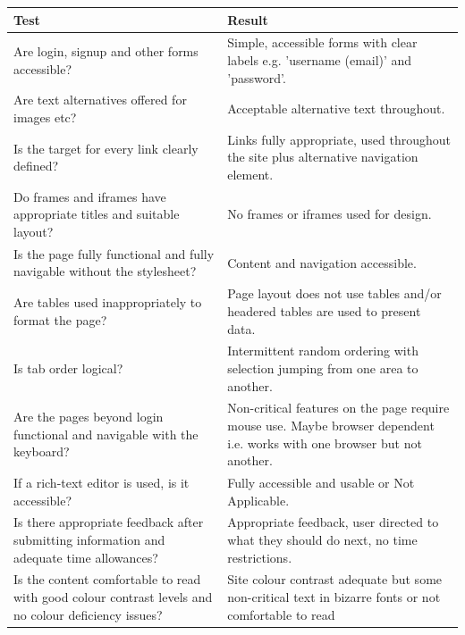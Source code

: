 \begin{table}
  \centering
  \begin{tabular}{|p{150px}|p{250px}|}
    \hline
    Test  & Result\\ \hline

    Are login, signup and other forms accessible? & Simple, accessible forms with clear labels e.g. 'username (email)' and 'password'. \\ \hline

    Are text alternatives offered for images etc? & Acceptable alternative text throughout. \\ \hline

    Is the target for every link clearly defined? & Links fully appropriate, used throughout the site plus alternative navigation element. \\ \hline

    Do frames and iframes have appropriate titles and suitable layout? & No frames or iframes used for design. \\ \hline

    Is the page fully functional and fully navigable without the stylesheet? & Content and navigation accessible. \\ \hline

    Are tables used inappropriately to format the page? & Page layout does not use tables and/or headered tables are used to present data. \\ \hline

    Is tab order logical? & Intermittent random ordering with selection jumping from one area to another. \\ \hline

    Are the pages beyond login functional and navigable with the keyboard? & Non-critical features on the page require mouse use. Maybe browser dependent i.e. works with one browser but not another. \\ \hline

    If a rich-text editor is used, is it accessible?  & Fully accessible and usable or Not Applicable. \\ \hline

    Is there appropriate feedback after submitting information and adequate time allowances? & Appropriate feedback, user directed to what they should do next, no time restrictions.\\ \hline

    Is the content comfortable to read with good colour contrast levels and no colour deficiency issues? & Site colour contrast adequate but some non-critical text in bizarre fonts or not comfortable to read \\ \hline


\end{tabular}
\end{table}
